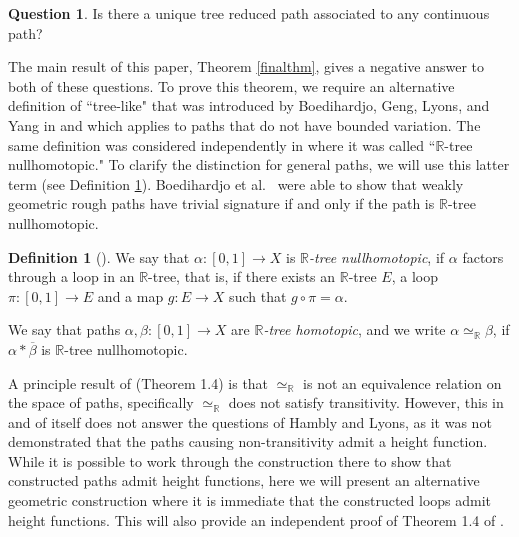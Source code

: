 \documentclass[11pt, leqno]{amsart}
\theoremstyle{definition}\newtheorem{definition}[theorem]{Definition}
\newtheorem{question}[theorem]{Question}
\newcommand{\den}{\simeq_{\mathbb R}}
\begin{document}
\begin{question}\cite[Problem 1.9]{HamblyLyons2010}
    Is there a unique tree reduced path associated to any continuous path?
\end{question}


The main result of this paper, Theorem \ref{finalthm}, gives a negative answer to both of these questions. To prove this theorem, we require an alternative definition of ``tree-like" that was introduced by  Boedihardjo, Geng, Lyons, and Yang in \cite{BoedihardjoGengLyonsYang2016} and which applies to paths that do not have bounded variation. The same definition was considered independently in \cite{BrazasConnerFabelKent_preprint} where it was called ``$\mathbb R$-tree nullhomotopic." To clarify the distinction for general paths, we will use this latter term (see Definition \ref{defn: R-tree nullhomotopic}). Boedihardjo et al.~ were able to show that weakly geometric rough paths have trivial signature if and only if the path is $\mathbb R$-tree nullhomotopic.



\begin{definition}[\cite{BoedihardjoGengLyonsYang2016, BrazasConnerFabelKent_preprint}]\label{defn: R-tree nullhomotopic}
    We say that $\alpha: [0,1]\to X$ is \emph{$\mathbb R$-tree nullhomotopic}, if $\alpha$ factors through a loop in an $\mathbb R$-tree, that is, if there exists an $\mathbb{R}$-tree $E$, a loop $\pi:[0,1]\to E$ and a map $g:E\to X$ such that $g\circ\pi=\alpha$.

    We say that paths $\alpha,\beta:[0,1]\to X$ are \emph{$\mathbb R$-tree homotopic}, and we write $\alpha\den\beta$, if $\alpha*\overline{\beta}$ is $\mathbb R$-tree nullhomotopic.
\end{definition}


A principle result of \cite{BrazasConnerFabelKent_preprint} (Theorem 1.4) is that $\den$ is not an equivalence relation on the space of paths, specifically $\den$ does not satisfy transitivity.  However, this in and of itself does not answer the questions of Hambly and Lyons, as it was not demonstrated that the paths causing non-transitivity admit a height function.  While it  is possible to work through the construction there to show that constructed paths admit height functions, here we will present an alternative geometric construction where it is immediate that the constructed loops admit height functions.  This will also provide an independent proof of Theorem 1.4 of \cite{BrazasConnerFabelKent_preprint}.
\end{document}
